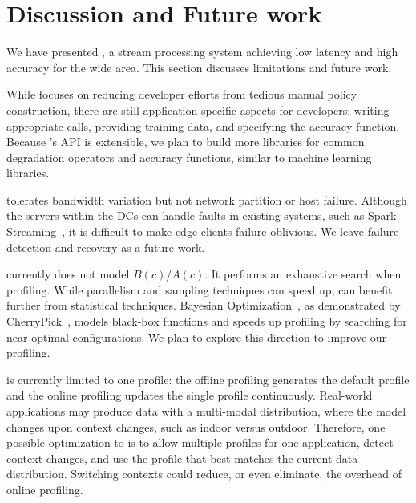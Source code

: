 \section{Discussion and Future work}
\label{sec:discussion}

We have presented \sysname{}, a stream processing system achieving low latency
and high accuracy for the wide area. This section discusses limitations and
future work.

 While \sysname{} focuses on reducing
developer efforts from tedious manual policy construction, there are still
application-specific aspects for developers: writing appropriate \maybe{} calls,
providing training data, and specifying the accuracy function. Because
\sysname{}'s API is extensible, we plan to build more libraries for common
degradation operators and accuracy functions, similar to machine learning
libraries.

 \sysname{} tolerates bandwidth
variation but not network partition or host failure. Although the servers within
the DCs can handle faults in existing systems, such as Spark
Streaming~\cite{zaharia2013discretized}, it is difficult to make edge clients
failure-oblivious.  We leave failure detection and recovery as a future work.

 \sysname{} currently does not model $B(c)$/$A(c)$. It
performs an exhaustive search when profiling. While parallelism and sampling
techniques can speed up, \sysname{} can benefit further from statistical
techniques. Bayesian Optimization~\cite{snoek2012practical}, as demonstrated by
CherryPick~\cite{alipourfard2017cherrypick}, models black-box functions and
speeds up profiling by searching for near-optimal configurations. We plan to
explore this direction to improve our profiling.


 \sysname{} is currently limited to one profile: the
offline profiling generates the default profile and the online profiling updates
the single profile continuously.  Real-world applications may produce data with
a multi-modal distribution, where the model changes upon context changes, such
as indoor versus outdoor. Therefore, one possible optimization to \sysname{} is
to allow multiple profiles for one application, detect context changes, and use
the profile that best matches the current data distribution.  Switching contexts
could reduce, or even eliminate, the overhead of online profiling.

